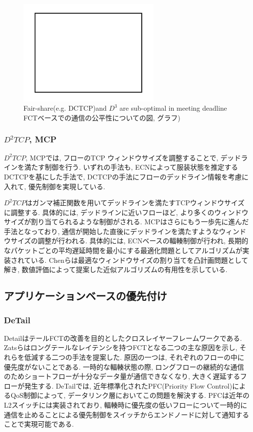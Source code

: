 \begin{figure}[t]
    \begin{center}
    \includegraphics[autoebb, width=200pt]{./img/test.pdf}
    \caption{Fair-share(e.g. DCTCP)and $D^3$ are sub-optimal in meeting
    deadline FCTベースでの通信の公平性についての図, グラフ)}
    \label{fig:fair_share}
    \end{center}
\end{figure}

\subsubsection{$D^{2}TCP$, MCP}
$D^{2}TCP$\cite{d2tcp}, MCP\cite{mcp}では, フローのTCP ウィンドウサイズを調整することで, デッドラインを満たす制御を行う. 
いずれの手法も, ECNによって服装状態を推定するDCTCP\cite{dctcp}を基にした手法で,
DCTCPの手法にフローのデッドライン情報を考慮に入れて, 優先制御を実現している. 

$D^{2}TCP$はガンマ補正関数を用いてデッドラインを満たすTCPウィンドウサイズに調整する. 
具体的には, デッドラインに近いフローほど, より多くのウィンドウサイズが割り当てられるような制御がされる. 
MCP\cite{mcp}はさらにもう一歩先に進んだ手法となっており, 通信が開始した直後にデッドラインを満たすようなウィンドウサイズの調整が行われる. 
具体的には, ECNベースの輻輳制御が行われ, 長期的なパケットごとの平均遅延時間を最小にする最適化問題としてアルゴリズムが実装されている. 
Chenら\cite{mcp}は最適なウィンドウサイズの割り当てを凸計画問題として解き, 数値評価によって提案した近似アルゴリズムの有用性を示している. 


\subsection{アプリケーションベースの優先付け}
\label{subsec:ap_priority}

\subsubsection{DeTail}
Detail\cite{detail}はテールFCTの改善を目的としたクロスレイヤーフレームワークである. 
Zatsらはロングテールなレイテンシを持つFCTとなる二つの主な原因を示し, それらを低減する二つの手法を提案した. 
原因の一つは, それぞれのフローの中に優先度がないことである. 
一時的な輻輳状態の際, ロングフローの継続的な通信のためショートフローが十分なデータ量が通信できなくなり, 大きく遅延するフローが発生する. 
DeTailでは, 近年標準化されたPFC(Priority Flow Control)によるQoS制御によって, データリンク層においてこの問題を解決する. 
PFCは近年のL2スイッチには実装されており,
輻輳時に優先度の低いフローについて一時的に通信を止めることによる優先制御をスイッチからエンドノードに対して通知することで実現可能である. 

